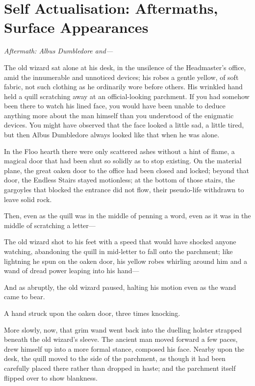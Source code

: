 \chapter{Self Actualisation: Aftermaths, Surface Appearances}

\emph{Aftermath: Albus Dumbledore and---}

The old wizard sat alone at his desk, in the unsilence of the
Headmaster's office, amid the innumerable and unnoticed devices; his
robes a gentle yellow, of soft fabric, not such clothing as he
ordinarily wore before others. His wrinkled hand held a quill scratching
away at an official-looking parchment. If you had somehow been there to
watch his lined face, you would have been unable to deduce anything more
about the man himself than you understood of the enigmatic devices. You
might have observed that the face looked a little sad, a little tired,
but then Albus Dumbledore always looked like that when he was alone.

In the Floo hearth there were only scattered ashes without a hint of
flame, a magical door that had been shut so solidly as to stop existing.
On the material plane, the great oaken door to the office had been
closed and locked; beyond that door, the Endless Stairs stayed
motionless; at the bottom of those stairs, the gargoyles that blocked
the entrance did not flow, their pseudo-life withdrawn to leave solid
rock.

Then, even as the quill was in the middle of penning a word, even as it
was in the middle of scratching a letter---

The old wizard shot to his feet with a speed that would have shocked
anyone watching, abandoning the quill in mid-letter to fall onto the
parchment; like lightning he spun on the oaken door, his yellow robes
whirling around him and a wand of dread power leaping into his hand---

And as abruptly, the old wizard paused, halting his motion even as the
wand came to bear.

A hand struck upon the oaken door, three times knocking.

More slowly, now, that grim wand went back into the duelling holster
strapped beneath the old wizard's sleeve. The ancient man moved forward
a few paces, drew himself up into a more formal stance, composed his
face. Nearby upon the desk, the quill moved to the side of the
parchment, as though it had been carefully placed there rather than
dropped in haste; and the parchment itself flipped over to show
blankness.

